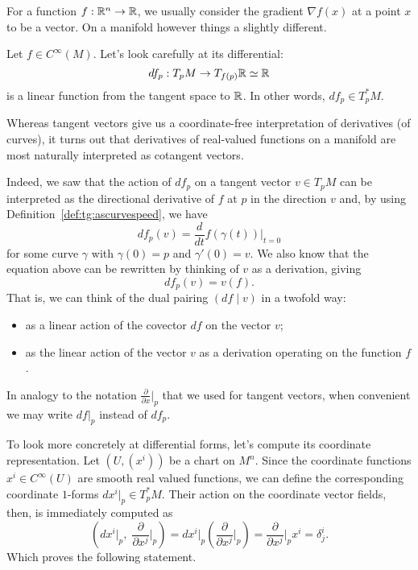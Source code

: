 For a function $f:\mathbb{R}^n\to\mathbb{R}$, we usually consider the gradient $\nabla f(x)$ at a point $x$ to be a vector.
On a manifold however things a slightly different.

\begin{example}
	Let $f\in C^\infty(M)$.
	Let's look carefully at its differential:
	\begin{equation}
		df_p: T_p M \to T_{f(p)}\mathbb{R} \simeq \mathbb{R}
	\end{equation}
	is a linear function from the tangent space to $\mathbb{R}$.
	In other words, $df_p \in T_p^* M$.
\end{example}

Whereas tangent vectors give us a coordinate-free interpretation of derivatives (of curves), it turns out that derivatives of real-valued functions on a manifold are most naturally interpreted as cotangent vectors.

Indeed, we saw that the action of $df_p$ on a tangent vector $v\in T_p M$ can be interpreted as the directional derivative of $f$ at $p$ in the direction $v$ and, by using Definition~\ref{def:tg:ascurvespeed}, we have
\begin{equation}
	df_p(v) = \frac{d}{dt}f(\gamma(t))\Big|_{t=0}
\end{equation}
for some curve $\gamma$ with $\gamma(0) = p$ and $\gamma'(0)=v$.
We also know that the equation above can be rewritten by thinking of $v$ as a derivation, giving
\begin{equation}
	df_p(v) = v(f).
\end{equation}
That is, we can think of the dual pairing $(df\mid v)$ in a twofold way:
\begin{itemize}
	\item as a linear action of the covector $df$ on the vector $v$;
	\item as the linear action of the vector $v$ as a derivation operating on the function $f$.
\end{itemize}

\begin{notation}
	In analogy to the notation $\frac{\partial}{\partial x}\big|_p$ that we used for tangent vectors, when convenient we may write $df|_p$ instead of $df_p$.
\end{notation}

To look more concretely at differential forms, let's compute its coordinate representation.
Let $(U,(x^i))$ be a chart on $M^n$.
Since the coordinate functions $x^i\in C^\infty(U)$ are smooth real valued functions, we can define the corresponding coordinate $1$-forms $dx^i|_p \in T_p^* M$.
Their action on the coordinate vector fields, then, is immediately computed as
\begin{equation}
	\left(dx^i|_p ,\; \frac{\partial}{\partial x^j}\Big|_p\right) =
	dx^i|_p \left(\frac{\partial}{\partial x^j}\Big|_p\right)
	= \frac{\partial}{\partial x^j}\Big|_p x^i
	= \delta^i_j.
\end{equation}
Which proves the following statement.

